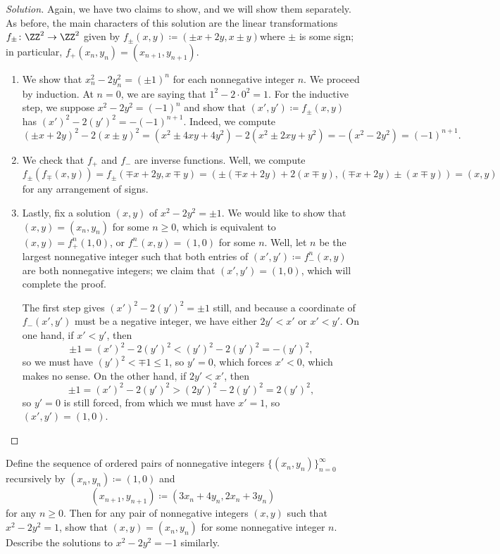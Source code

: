 \documentclass[../notes.tex]{subfiles}
\begin{document}
\begin{proof}[Solution]
	Again, we have two claims to show, and we will show them separately. As before, the main characters of this solution are the linear transformations $f_\pm\colon\ZZ^2\to\ZZ^2$ given by $f_\pm(x,y)\coloneqq(\pm x+2y,x\pm y)$where $\pm$ is some sign; in particular, $f_+(x_n,y_n)=(x_{n+1},y_{n+1})$.
	\begin{enumerate}
		\item We show that $x_n^2-2y_n^2=(\pm1)^n$ for each nonnegative integer $n$. We proceed by induction. At $n=0$, we are saying that $1^2-2\cdot0^2=1$. For the inductive step, we suppose $x^2-2y^2=(-1)^n$ and show that $(x',y')\coloneqq f_\pm(x,y)$ has $(x')^2-2(y')^2=-(-1)^{n+1}$. Indeed, we compute
		\[(\pm x+2y)^2-2(x\pm y)^2=\left(x^2\pm4xy+4y^2\right)-2\left(x^2\pm2xy+y^2\right)=-\left(x^2-2y^2\right)=(-1)^{n+1}.\]
		\item We check that $f_+$ and $f_-$ are inverse functions. Well, we compute
		\[f_\pm(f_\mp(x,y))=f_\pm(\mp x+2y,x\mp y)=(\pm(\mp x+2y)+2(x\mp y),(\mp x+2y)\pm(x\mp y))=(x,y)\]
		for any arrangement of signs.
		\item Lastly, fix a solution $(x,y)$ of $x^2-2y^2=\pm1$. We would like to show that $(x,y)=(x_n,y_n)$ for some $n\ge0$, which is equivalent to $(x,y)=f_+^n(1,0)$, or $f^n_-(x,y)=(1,0)$ for some $n$. Well, let $n$ be the largest nonnegative integer such that both entries of $(x',y')\coloneqq f_-^n(x,y)$ are both nonnegative integers; we claim that $(x',y')=(1,0)$, which will complete the proof.

		The first step gives $(x')^2-2(y')^2=\pm1$ still, and because a coordinate of $f_-(x',y')$ must be a negative integer, we have either $2y'<x'$ or $x'<y'$. On one hand, if $x'<y'$, then
		\[\pm1=(x')^2-2(y')^2<(y')^2-2(y')^2=-(y')^2,\]
		so we must have $(y')^2<\mp1\le1$, so $y'=0$, which forces $x'<0$, which makes no sense. On the other hand, if $2y'<x'$, then
		\[\pm1=(x')^2-2(y')^2>(2y')^2-2(y')^2=2(y')^2,\]
		so $y'=0$ is still forced, from which we must have $x'=1$, so $(x',y')=(1,0)$.
		\qedhere
	\end{enumerate}
\end{proof}
\begin{exe}
	Define the sequence of ordered pairs of nonnegative integers $\{(x_n,y_n)\}_{n=0}^\infty$ recursively by $(x_n,y_n)\coloneqq(1,0)$ and
	\[(x_{n+1},y_{n+1})\coloneqq(3x_n+4y_n,2x_n+3y_n)\]
	for any $n\ge0$. Then for any pair of nonnegative integers $(x,y)$ such that $x^2-2y^2=1$, show that $(x,y)=(x_n,y_n)$ for some nonnegative integer $n$. Describe the solutions to $x^2-2y^2=-1$ similarly.
\end{exe}
\end{document}
